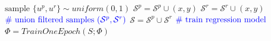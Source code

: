 \documentclass{article}
\theoremstyle{plain}
\theoremstyle{definition}
\theoremstyle{remark}
\begin{document}
\begin{algorithm}[tb]
\begin{algorithmic}
                \STATE $\text{sample } \{u^p, u^r\} \sim uniform(0,1)$
                \STATE $\mathcal{S}^p = \mathcal{S}^p \cup (x, y)$
                \ENDIF
                \STATE $\mathcal{S}^r = \mathcal{S}^r \cup (x, y)$
                \ENDIF
            \ENDFOR
            \STATE
            \STATE $\color{blue}{\text{\# union filtered samples } (\mathcal{S}^p, \mathcal{S}^r)}$
            \STATE $\mathcal{S} = \mathcal{S}^p \cup \mathcal{S}^r$
            \STATE
            \STATE $\text{\color{blue}{\# train regression model}}$
            \STATE $\Phi = TrainOneEpoch(S ; \Phi)$
            \STATE 
        \ENDFOR
    \end{algorithmic}
\end{algorithm}
\end{document}
